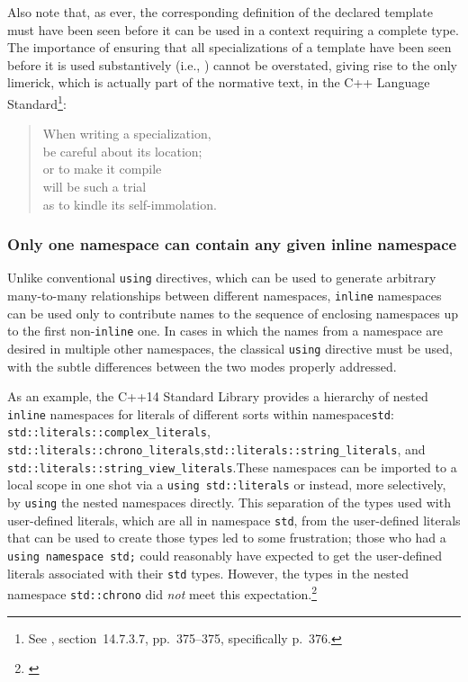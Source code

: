 \noindent Also note that, as ever, the corresponding definition of the declared
template must have been seen before it can be used in a context
requiring a complete type. The importance of ensuring that all
specializations of a template have been seen before it is used
substantively (i.e., ) cannot be overstated, giving
rise to the only limerick, which is actually part of the normative text,
in the C++ Language Standard{\cprotect\footnote{See \cite{iso11},
  section~14.7.3.7, pp.~375--375, specifically p.~376.}}:
\begin{quote}
When writing a specialization,\\
be careful about its location;\\
or to make it compile\\
will be such a trial\\
as to kindle its self-immolation.
\end{quote}

\subsubsection[Only one namespace can contain any given \lstinline!inline! namespace]{Only one namespace can contain any given {\SubsubsecCode inline} namespace}\label{only-one-namespace-can-contain-any-given-inline-namespace}

Unlike conventional \lstinline!using! directives, which can be used to
generate arbitrary many-to-many relationships between different
namespaces, \lstinline!inline! namespaces can be used only to contribute
names to the sequence of enclosing namespaces up to the first
non-\lstinline!inline! one. In cases in which the names from a namespace
are desired in multiple other namespaces, the classical \lstinline!using!
directive must be used, with the subtle differences between the two
modes properly addressed.

As an example, the C++14 Standard Library provides a hierarchy of nested
\lstinline!inline! namespaces for literals of different sorts within
namespace\linebreak[4] \lstinline!std!: \lstinline!std::literals::complex_literals!,
\lstinline!std::literals::chrono_literals!,\linebreak[4]
\lstinline!std::literals::string_literals!, and
\lstinline!std::literals::string_view_literals!.\linebreak[4] 
These namespaces can
be imported to a local scope in one shot via a
\lstinline!using!~\lstinline!std::literals! or instead, more selectively, by
\lstinline!using! the nested namespaces directly. This separation of the
types used with user-defined literals, which are all in namespace
\lstinline!std!, from the user-defined literals that can be used to create
those types led to some frustration; those who had a
\lstinline!using!~\lstinline!namespace!~\lstinline!std;! could reasonably have
expected to get the user-defined literals associated with their
\lstinline!std! types. However, the types in the nested namespace
\lstinline!std::chrono! did \emph{not} meet this
expectation.{\cprotect\footnote{\cite{hinnant17}}}

